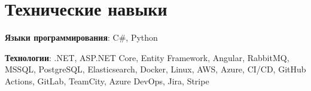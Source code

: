 \documentclass[letterpaper,11pt]{article}
\begin{document}

%
\section{Технические навыки}
\resumeSubHeadingListStart
\item{
            \textbf{Языки программирования}{: C\#, Python}
      }
\item{
            \textbf{Технологии}{: .NET, ASP.NET Core, Entity Framework, Angular, RabbitMQ, MSSQL, PostgreSQL, Elasticsearch, Docker, Linux, AWS, Azure, CI/CD, GitHub Actions, GitLab, TeamCity, Azure DevOps, Jira, Stripe}
      }
\resumeSubHeadingListEnd


\end{document}
